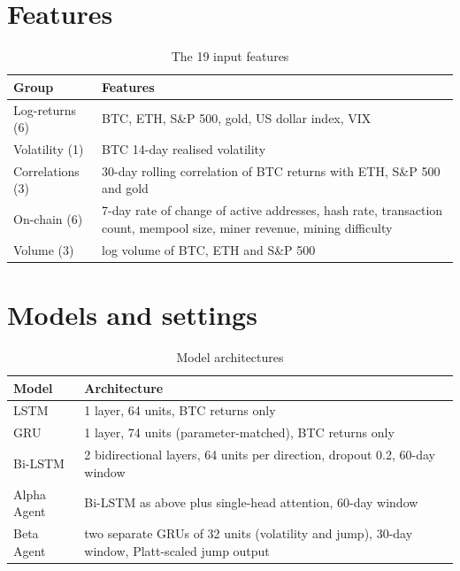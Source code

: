 \section{Features}\label{app:features}

\begin{table}[!h]
  \centering
  \caption{The 19 input features}
  \label{tab:features}
  \footnotesize
  \begin{tabularx}{\columnwidth}{@{}lX@{}}
    \toprule
    Group & Features \\
    \midrule
    Log-returns (6) & BTC, ETH, S\&P 500, gold, US dollar index, VIX \\
    Volatility (1) & BTC 14-day realised volatility \\
    Correlations (3) & 30-day rolling correlation of BTC returns with ETH, S\&P 500 and gold \\
    On-chain (6) & 7-day rate of change of active addresses, hash rate, transaction count, mempool size, miner revenue, mining difficulty \\
    Volume (3) & log volume of BTC, ETH and S\&P 500 \\
    \bottomrule
  \end{tabularx}
\end{table}

\section{Models and settings}\label{app:hyper}

\begin{table}[!h]
  \centering
  \caption{Model architectures}
  \label{tab:arch}
  \footnotesize
  \begin{tabularx}{\columnwidth}{@{}lX@{}}
    \toprule
    Model & Architecture \\
    \midrule
    LSTM & 1 layer, 64 units, BTC returns only \\
    GRU & 1 layer, 74 units (parameter-matched), BTC returns only \\
    Bi-LSTM & 2 bidirectional layers, 64 units per direction, dropout 0.2, 60-day window \\
    Alpha Agent & Bi-LSTM as above plus single-head attention, 60-day window \\
    Beta Agent & two separate GRUs of 32 units (volatility and jump), 30-day window, Platt-scaled jump output \\
    \bottomrule
  \end{tabularx}
\end{table}

